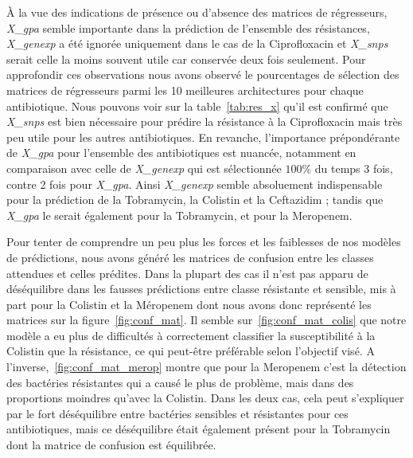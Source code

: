 \documentclass[11pt]{article}
\begin{document}
  À la vue des indications de présence ou d'absence des matrices de régresseurs, \textit{X\_gpa} semble importante dans la prédiction de l'ensemble des résistances, \textit{X\_genexp} a été ignorée uniquement dans le cas de la Ciprofloxacin et \textit{X\_snps} serait celle la moins souvent utile car conservée deux fois seulement.
  Pour approfondir ces observations nous avons observé le pourcentages de sélection des matrices de régresseurs parmi les 10 meilleures architectures pour chaque antibiotique.
  Nous pouvons voir sur la table~\ref{tab:res_x} qu'il est confirmé que \textit{X\_snps} est bien nécessaire pour prédire la résistance à la Ciprofloxacin mais très peu utile pour les autres antibiotiques.
  En revanche, l'importance prépondérante de \textit{X\_gpa} pour l'ensemble des antibiotiques est nuancée, notamment en comparaison avec celle de \textit{X\_genexp} qui est sélectionnée $100\%$ du temps 3 fois, contre 2 fois pour \textit{X\_gpa}.
  Ainsi \textit{X\_genexp} semble absoluement indispensable pour la prédiction de la Tobramycin, la Colistin et la Ceftazidim ;
  tandis que \textit{X\_gpa} le serait également pour la Tobramycin, et pour la Meropenem.

  

  Pour tenter de comprendre un peu plus les forces et les faiblesses de nos modèles de prédictions, nous avons généré les matrices de confusion entre les classes attendues et celles prédites.
  Dans la plupart des cas il n'est pas apparu de déséquilibre dans les fausses prédictions entre classe résistante et sensible, mis à part pour la Colistin et la Méropenem dont nous avons donc représenté les matrices sur la figure~\ref{fig:conf_mat}.
  Il semble sur~\ref{fig:conf_mat_colis} que notre modèle a eu plus de difficultés à correctement classifier la susceptibilité à la Colistin que la résistance, ce qui peut-être préférable selon l'objectif visé.
  A l'inverse,~\ref{fig:conf_mat_merop} montre que pour la Meropenem c'est la détection des bactéries résistantes qui a causé le plus de problème, mais dans des proportions moindres qu'avec la Colistin.
  Dans les deux cas, cela peut s'expliquer par le fort déséquilibre entre bactéries sensibles et résistantes pour ces antibiotiques, mais ce déséquilibre était également présent pour la Tobramycin dont la matrice de confusion est équilibrée.
\end{document}
